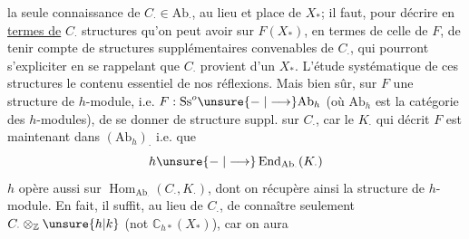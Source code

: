 la seule connaissance de $C_\cdot\in\mathrm{Ab}_\cdot$, au lieu
et place de $X_*$; il faut, pour 
décrire en \uline{termes de} $C_\cdot$  structures
qu'on peut  avoir sur $F(X_*)$, en termes
de celle de $F$, de tenir compte de
structures supplémentaires convenables
de $C_\cdot$, qui pourront s'expliciter en se
rappelant que $C_\cdot$ provient d'un $X_*$. 
L'étude systématique de ces structures 
 
le contenu essentiel de nos réflexions.
Mais bien sûr,  
 sur $F$ une structure de
$h$-module, i.e. $F:\mathrm{Ss}^o\unsure{\mathrel{-}|\longrightarrow}\mathrm{Ab}_h$
(où $\mathrm{Ab}_h$ est la catégorie des $h$-modules),
 de se donner de structure
suppl. sur $C_\cdot$, car  
 le $K_\cdot$ qui décrit $F$ est
maintenant dans $(\mathrm{Ab}_h)_\cdot$ i.e. que
\[
h\unsure{\mathrel{-}|\longrightarrow}\operatorname{End}_{\mathrm{Ab}_\cdot}(K_\cdot)
\]
$h$ opère aussi sur $\operatorname{Hom}_{\mathrm{Ab}_\cdot}(C_\cdot,K_\cdot)$,
dont on récupère ainsi la structure
de $h$-module. En fait, il suffit,
au lieu de $C_\cdot$, de connaître
seulement  $C_\cdot\otimes_{\mathbb Z}\unsure{h|k}$ (not $\mathbb C_{h*}(X_*)$),
car on aura

